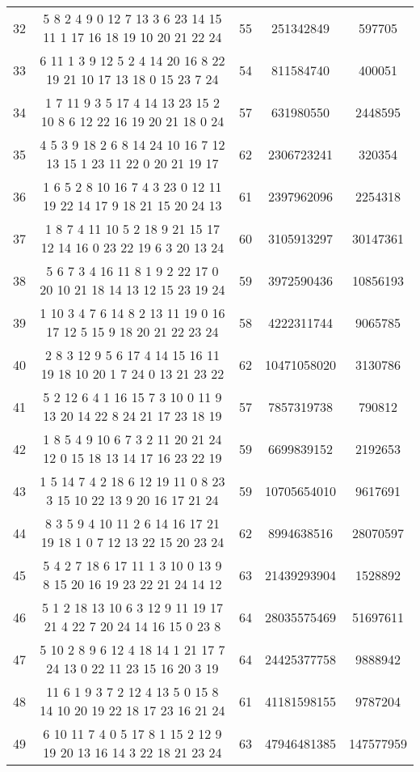 \documentclass[a4paper,11pt,oneside,openany]{jsbook}
\begin{document}
\begin{table}[]
{\begin{tabular}{|c|c|c|c|c|}
32 & 5 8 2 4 9 0 12 7 13 3 6 23 14 15 11 1 17 16 18 19 10 20 21 22 24  & 55 & 251342849 & 597705 \\
33 & 6 11 1 3 9 12 5 2 4 14 20 16 8 22 19 21 10 17 13 18 0 15 23 7 24  & 54 & 811584740 & 400051 \\
34 & 1 7 11 9 3 5 17 4 14 13 23 15 2 10 8 6 12 22 16 19 20 21 18 0 24  & 57 & 631980550 & 2448595 \\
35 & 4 5 3 9 18 2 6 8 14 24 10 16 7 12 13 15 1 23 11 22 0 20 21 19 17  & 62 & 2306723241 & 320354 \\
36 & 1 6 5 2 8 10 16 7 4 3 23 0 12 11 19 22 14 17 9 18 21 15 20 24 13  & 61 & 2397962096 & 2254318 \\
37 & 1 8 7 4 11 10 5 2 18 9 21 15 17 12 14 16 0 23 22 19 6 3 20 13 24  & 60 & 3105913297 & 30147361 \\
38 & 5 6 7 3 4 16 11 8 1 9 2 22 17 0 20 10 21 18 14 13 12 15 23 19 24  & 59 & 3972590436 & 10856193 \\
39 & 1 10 3 4 7 6 14 8 2 13 11 19 0 16 17 12 5 15 9 18 20 21 22 23 24  & 58 & 4222311744 & 9065785 \\
40 & 2 8 3 12 9 5 6 17 4 14 15 16 11 19 18 10 20 1 7 24 0 13 21 23 22  & 62 & 10471058020 & 3130786 \\
41 & 5 2 12 6 4 1 16 15 7 3 10 0 11 9 13 20 14 22 8 24 21 17 23 18 19  & 57 & 7857319738 & 790812 \\
42 & 1 8 5 4 9 10 6 7 3 2 11 20 21 24 12 0 15 18 13 14 17 16 23 22 19  & 59 & 6699839152 & 2192653 \\
43 & 1 5 14 7 4 2 18 6 12 19 11 0 8 23 3 15 10 22 13 9 20 16 17 21 24  & 59 & 10705654010 & 9617691 \\
44 & 8 3 5 9 4 10 11 2 6 14 16 17 21 19 18 1 0 7 12 13 22 15 20 23 24  & 62 & 8994638516 & 28070597 \\
45 & 5 4 2 7 18 6 17 11 1 3 10 0 13 9 8 15 20 16 19 23 22 21 24 14 12  & 63 & 21439293904 & 1528892 \\
46 & 5 1 2 18 13 10 6 3 12 9 11 19 17 21 4 22 7 20 24 14 16 15 0 23 8  & 64 & 28035575469 & 51697611 \\
47 & 5 10 2 8 9 6 12 4 18 14 1 21 17 7 24 13 0 22 11 23 15 16 20 3 19  & 64 & 24425377758 & 9888942 \\
48 & 11 6 1 9 3 7 2 12 4 13 5 0 15 8 14 10 20 19 22 18 17 23 16 21 24  & 61 & 41181598155 & 9787204 \\
49 & 6 10 11 7 4 0 5 17 8 1 15 2 12 9 19 20 13 16 14 3 22 18 21 23 24  & 63 & 47946481385 & 147577959 \\ \hline
\end{tabular}
}
\end{table}
\end{document}
